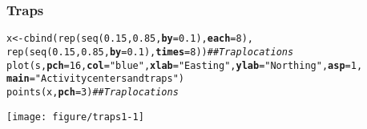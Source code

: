 \documentclass[color=usenames,dvipsnames]{beamer}\usepackage[]{graphicx}\usepackage[]{color}
\makeatletter
\newcommand{\hlnum}[1]{\textcolor[rgb]{0.69,0.494,0}{#1}}%
\newcommand{\hlstr}[1]{\textcolor[rgb]{0.749,0.012,0.012}{#1}}%
\newcommand{\hlcom}[1]{\textcolor[rgb]{0.514,0.506,0.514}{\textit{#1}}}%
\newcommand{\hlstd}[1]{\textcolor[rgb]{0,0,0}{#1}}%
\newcommand{\hlkwb}[1]{\textcolor[rgb]{0,0.341,0.682}{#1}}%
\newcommand{\hlkwc}[1]{\textcolor[rgb]{0,0,0}{\textbf{#1}}}%
\newcommand{\hlkwd}[1]{\textcolor[rgb]{0.004,0.004,0.506}{#1}}%
\newenvironment{kframe}{%
 \def\at@end@of@kframe{}%
 \ifinner\ifhmode%
  \def\at@end@of@kframe{\end{minipage}}%
  \begin{minipage}{\columnwidth}%
 \fi\fi%
 \def\FrameCommand##1{\hskip\@totalleftmargin \hskip-\fboxsep
 \colorbox{shadecolor}{##1}\hskip-\fboxsep
     \hskip-\linewidth \hskip-\@totalleftmargin \hskip\columnwidth}%
 \MakeFramed {\advance\hsize-\width
   \@totalleftmargin\z@ \linewidth\hsize
   \@setminipage}}%
 {\par\unskip\endMakeFramed%
 \at@end@of@kframe}
\newenvironment{knitrout}{}{} %
\makeatother
\begin{document}
\begin{frame}[fragile]
  \frametitle{Traps}
\begin{knitrout}\scriptsize
{}\color{fgcolor}\begin{kframe}
\begin{alltt}
\hlstd{x} \hlkwb{<-} \hlkwd{cbind}\hlstd{(}\hlkwd{rep}\hlstd{(}\hlkwd{seq}\hlstd{(}\hlnum{0.15}\hlstd{,} \hlnum{0.85}\hlstd{,} \hlkwc{by}\hlstd{=}\hlnum{0.1}\hlstd{),} \hlkwc{each}\hlstd{=}\hlnum{8}\hlstd{),}
           \hlkwd{rep}\hlstd{(}\hlkwd{seq}\hlstd{(}\hlnum{0.15}\hlstd{,} \hlnum{0.85}\hlstd{,} \hlkwc{by}\hlstd{=}\hlnum{0.1}\hlstd{),} \hlkwc{times}\hlstd{=}\hlnum{8}\hlstd{))}  \hlcom{## Trap locations}
\hlkwd{plot}\hlstd{(s,} \hlkwc{pch}\hlstd{=}\hlnum{16}\hlstd{,} \hlkwc{col}\hlstd{=}\hlstr{"blue"}\hlstd{,} \hlkwc{xlab}\hlstd{=}\hlstr{"Easting"}\hlstd{,} \hlkwc{ylab}\hlstd{=}\hlstr{"Northing"}\hlstd{,} \hlkwc{asp}\hlstd{=}\hlnum{1}\hlstd{,}
     \hlkwc{main}\hlstd{=}\hlstr{"Activity centers and traps"}\hlstd{)}
\hlkwd{points}\hlstd{(x,} \hlkwc{pch}\hlstd{=}\hlnum{3}\hlstd{)}              \hlcom{## Trap locations}
\end{alltt}
\end{kframe}

{\centering \texttt{[image: figure/traps1-1]} 

}


\end{knitrout}
\end{frame}
\end{document}
